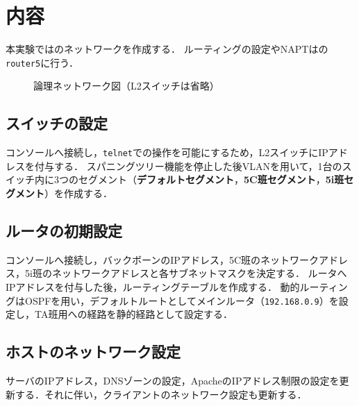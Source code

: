 \section{内容}
本実験ではのネットワークを作成する．
ルーティングの設定やNAPTはの\texttt{router5}に行う．
\begin{figure}
    \centering
    
    \caption{論理ネットワーク図（L2スイッチは省略）}
    \label{fig:ネットワーク図}
\end{figure}
\subsection{スイッチの設定}
コンソールへ接続し，\texttt{telnet}での操作を可能にするため，L2スイッチにIPアドレスを付与する．
スパニングツリー機能を停止した後VLANを用いて，1台のスイッチ内に3つのセグメント（\textbf{デフォルトセグメント}，\textbf{5C班セグメント}，\textbf{5i班セグメント}）を作成する．
\subsection{ルータの初期設定}
コンソールへ接続し，バックボーンのIPアドレス，5C班のネットワークアドレス，5i班のネットワークアドレスと各サブネットマスクを決定する．
ルータへIPアドレスを付与した後，ルーティングテーブルを作成する．
動的ルーティングはOSPFを用い，デフォルトルートとしてメインルータ（\texttt{192.168.0.9}）を設定し，TA班用への経路を静的経路として設定する．
\subsection{ホストのネットワーク設定}
サーバのIPアドレス，DNSゾーンの設定，ApacheのIPアドレス制限の設定を更新する．それに伴い，クライアントのネットワーク設定も更新する．
